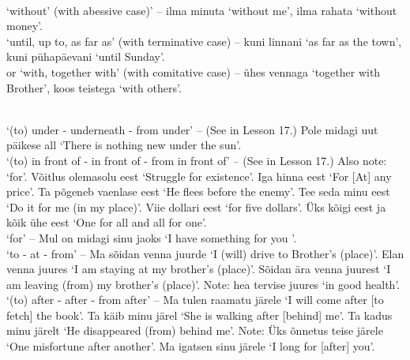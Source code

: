 \newSection \label{section-400}  \\

 `without' (with abessive case)’ -- ilma minuta `without me', ilma rahata `without money'. \\

 `until, up to, as far as' (with terminative case) -- kuni linnani `as far as the town', kuni pühapäevani `until Sunday'. \\

 or  `with, together with' (with comitative case) -- ühes vennaga `together with Brother', koos teistega `with others'.


\newSection \label{section-401}  \\

 `(to) under - underneath - from under' -- (See  in Lesson 17.) Pole midagi uut päikese all `There is nothing new under the sun'. \\

 `(to) in front of - in front of - from in front of' -- (See  in Lesson 17.) Also note:  `for'. Võitlus olemasolu eest `Struggle for existence'. Iga hinna eest `For [At] any price'. Ta põgeneb vaenlase eest `He flees before the enemy'. Tee seda minu eest `Do it for me (in my place)'. Viie dollari eest `for five dollars'. Üks kõigi eest ja kõik ühe eest `One for all and all for one'. \\

 `for' -- Mul on midagi sinu jaoks `I have something for you \sing'. \\

 `to - at - from' -- Ma sõidan venna juurde `I (will) drive to Brother's (place)'. Elan venna juures `I am staying at my brother's (place)'. Sõidan ära venna juurest `I am leaving (from) my brother's (place)'. Note: hea tervise juures `in good health'. \\

 `(to) after - after - from after' -- Ma tulen raamatu järele `I will come after [to fetch] the book'. Ta käib minu järel `She is walking after [behind] me'. Ta kadus minu järelt `He disappeared (from) behind me'. Note: Üks õnnetus teise järele `One misfortune after another'. Ma igatsen sinu järele `I long for [after] you'. \\

